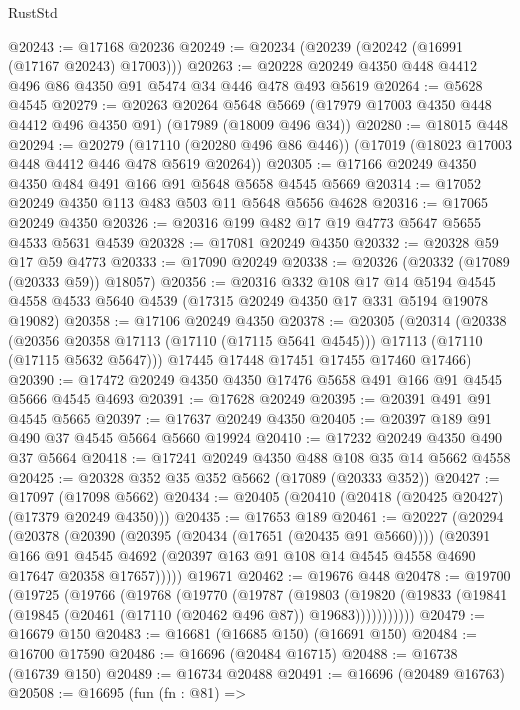 \begin{lexlean}{RustStd}
\begin{coremodule}
@20243 := @17168 @20236
@20249 := @20234 (@20239 (@20242 (@16991 (@17167 @20243) @17003)))
@20263 := @20228 @20249 @4350 @448 @4412 @496 @86 @4350 @91 @5474 @34 @446 @478 @493 @5619
@20264 := @5628 @4545
@20279 := @20263
    @20264
    @5648
    @5669
    (@17979 @17003 @4350 @448 @4412 @496 @4350 @91)
    (@17989 (@18009 @496 @34))
@20280 := @18015 @448
@20294 := @20279
    (@17110 (@20280 @496 @86 @446))
    (@17019 (@18023 @17003 @448 @4412 @446 @478 @5619 @20264))
@20305 := @17166 @20249 @4350 @4350 @484 @491 @166 @91 @5648 @5658 @4545 @5669
@20314 := @17052 @20249 @4350 @113 @483 @503 @11 @5648 @5656 @4628
@20316 := @17065 @20249 @4350
@20326 := @20316 @199 @482 @17 @19 @4773 @5647 @5655 @4533 @5631 @4539
@20328 := @17081 @20249 @4350
@20332 := @20328 @59 @17 @59 @4773
@20333 := @17090 @20249
@20338 := @20326 (@20332 (@17089 (@20333 @59)) @18057)
@20356 := @20316
    @332
    @108
    @17
    @14
    @5194
    @4545
    @4558
    @4533
    @5640
    @4539
    (@17315 @20249 @4350 @17 @331 @5194 @19078 @19082)
@20358 := @17106 @20249 @4350
@20378 := @20305
    (@20314
      (@20338
        (@20356 @20358 @17113 (@17110 (@17115 @5641 @4545)))
        @17113
        (@17110 (@17115 @5632 @5647)))
      @17445
      @17448
      @17451
      @17455
      @17460
      @17466)
@20390 := @17472 @20249 @4350 @4350 @17476 @5658 @491 @166 @91 @4545 @5666 @4545 @4693
@20391 := @17628 @20249
@20395 := @20391 @491 @91 @4545 @5665
@20397 := @17637 @20249 @4350
@20405 := @20397 @189 @91 @490 @37 @4545 @5664 @5660 @19924
@20410 := @17232 @20249 @4350 @490 @37 @5664
@20418 := @17241 @20249 @4350 @488 @108 @35 @14 @5662 @4558
@20425 := @20328 @352 @35 @352 @5662 (@17089 (@20333 @352))
@20427 := @17097 (@17098 @5662)
@20434 := @20405 (@20410 (@20418 (@20425 @20427) (@17379 @20249 @4350)))
@20435 := @17653 @189
@20461 := @20227
    (@20294
      (@20378
        (@20390
          (@20395 (@20434 (@17651 (@20435 @91 @5660))))
          (@20391
            @166
            @91
            @4545
            @4692
            (@20397 @163 @91 @108 @14 @4545 @4558 @4690 @17647 @20358 @17657)))))
    @19671
@20462 := @19676 @448
@20478 := @19700
    (@19725
      (@19766
        (@19768
          (@19770
            (@19787
              (@19803
                (@19820 (@19833 (@19841 (@19845 (@20461 (@17110 (@20462 @496 @87)) @19683)))))))))))
@20479 := @16679 @150
@20483 := @16681 (@16685 @150) (@16691 @150)
@20484 := @16700 @17590
@20486 := @16696 (@20484 @16715)
@20488 := @16738 (@16739 @150)
@20489 := @16734 @20488
@20491 := @16696 (@20489 @16763)
@20508 := @16695
    (fun (fn : @81) =>

\end{coremodule}
\end{lexlean}
